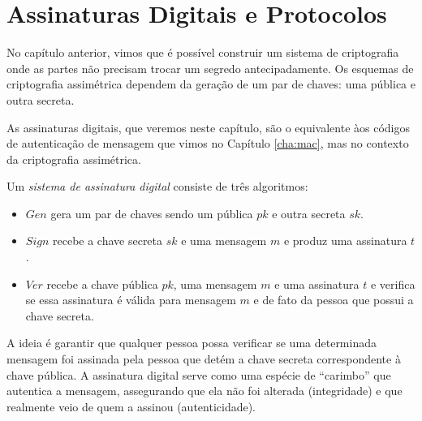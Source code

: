 \chapter{Assinaturas Digitais e Protocolos}
\label{cha:assinaturas-digitais}

No capítulo anterior, vimos que é possível construir um sistema de criptografia onde as partes não precisam trocar um segredo antecipadamente.
Os esquemas de criptografia assimétrica dependem da geração de um par de chaves: uma pública e outra secreta.

As assinaturas digitais, que veremos neste capítulo, são o equivalente àos códigos de autenticação de mensagem que vimos no Capítulo \ref{cha:mac}, mas no contexto da criptografia assimétrica.

\begin{center}
\end{center}

Um {\em sistema de assinatura digital} consiste de três algoritmos:
\begin{itemize}
\item $Gen$ gera um par de chaves sendo um pública $pk$ e outra secreta $sk$.
\item $Sign$ recebe a chave secreta $sk$ e uma mensagem $m$ e produz uma assinatura $t$.
\item $Ver$ recebe a chave pública $pk$, uma mensagem $m$ e uma assinatura $t$ e verifica se essa assinatura é válida para mensagem $m$ e de fato da pessoa que possui a chave secreta.
\end{itemize}

A ideia é garantir que qualquer pessoa possa verificar se uma determinada mensagem foi assinada pela pessoa que detém a chave secreta correspondente à chave pública.
A assinatura digital serve como uma espécie de ``carimbo'' que autentica a mensagem, assegurando que ela não foi alterada (integridade) e que realmente veio de quem a assinou (autenticidade).

